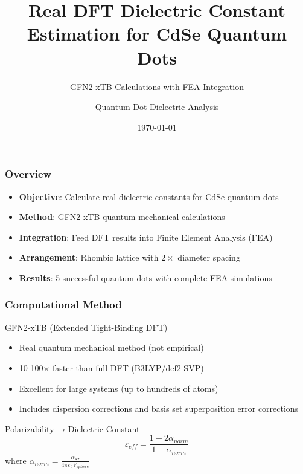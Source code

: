 \documentclass{beamer}
\title{Real DFT Dielectric Constant Estimation for CdSe Quantum Dots}
\subtitle{GFN2-xTB Calculations with FEA Integration}
\author{Quantum Dot Dielectric Analysis}
\date{\today}
\begin{document}
\frame{\titlepage}

\begin{frame}
\frametitle{Overview}
\begin{itemize}
    \item \textbf{Objective}: Calculate real dielectric constants for CdSe quantum dots
    \item \textbf{Method}: GFN2-xTB quantum mechanical calculations
    \item \textbf{Integration}: Feed DFT results into Finite Element Analysis (FEA)
    \item \textbf{Arrangement}: Rhombic lattice with $2\times$ diameter spacing
    \item \textbf{Results}: 5 successful quantum dots with complete FEA simulations
\end{itemize}
\end{frame}

\begin{frame}
\frametitle{Computational Method}
\begin{block}{GFN2-xTB (Extended Tight-Binding DFT)}
\begin{itemize}
    \item Real quantum mechanical method (not empirical)
    \item 10-100× faster than full DFT (B3LYP/def2-SVP)
    \item Excellent for large systems (up to hundreds of atoms)
    \item Includes dispersion corrections and basis set superposition error corrections
\end{itemize}
\end{block}

\begin{block}{Polarizability → Dielectric Constant}
\begin{equation}
\varepsilon_{eff} = \frac{1 + 2\alpha_{norm}}{1 - \alpha_{norm}}
\end{equation}
where $\alpha_{norm} = \frac{\alpha_{SI}}{4\pi\varepsilon_0 V_{sphere}}$
\end{block}
\end{frame}
\end{document}

